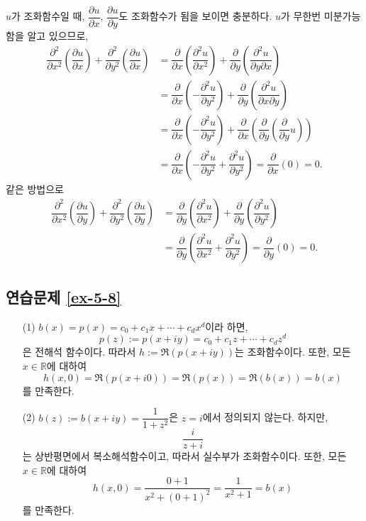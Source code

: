 $u$가 조화함수일 때, $\dfrac{\partial u}{\partial x}$, $\dfrac{\partial u}{\partial y}$도
조화함수가 됨을 보이면 충분하다.
$u$가 무한번 미분가능함을 알고 있으므로,
\begin{align*}
\dfrac{\partial^2}{\partial x^2}\left(\dfrac{\partial u}{\partial x}\right) 
+ \dfrac{\partial^2}{\partial y^2}\left(\dfrac{\partial u}{\partial x}\right) 
&= \dfrac{\partial}{\partial x}\left(\dfrac{\partial^2 u}{\partial x^2}\right) 
+ \dfrac{\partial}{\partial y}\left(\dfrac{\partial^2 u}{\partial y\partial x}\right)  \\
&= \dfrac{\partial}{\partial x}\left(-\dfrac{\partial^2 u}{\partial y^2}\right) 
+ \dfrac{\partial}{\partial y}\left(\dfrac{\partial^2 u}{\partial x\partial y}\right)  \\
&= \dfrac{\partial}{\partial x}\left(-\dfrac{\partial^2 u}{\partial y^2}\right) 
+ \dfrac{\partial}{\partial x}\left(\dfrac{\partial}{\partial y}
\left(\dfrac{\partial}{\partial y}u \right)\right)  \\
&= \dfrac{\partial}{\partial x}\left(-\dfrac{\partial^2 u}{\partial y^2}
+\dfrac{\partial^2 u}{\partial y^2} \right) 
= \dfrac{\partial}{\partial x}(0) = 0.
\end{align*}
같은 방법으로
\begin{align*}
\dfrac{\partial^2}{\partial x^2}\left(\dfrac{\partial u}{\partial y}\right) 
+ \dfrac{\partial^2}{\partial y^2}\left(\dfrac{\partial u}{\partial y}\right)  
&= \dfrac{\partial}{\partial y}\left(\dfrac{\partial^2 u}{\partial x^2}\right) 
+ \dfrac{\partial}{\partial y}\left(\dfrac{\partial^2 u}{\partial y^2}\right)  \\
&= \dfrac{\partial}{\partial y} \left(
\dfrac{\partial^2 u}{\partial x^2} + \dfrac{\partial^2 u}{\partial y^2} \right)
= \dfrac\partial{\partial y}(0) = 0.
\end{align*}

\subsection*{연습문제 \ref{ex-5-8}}

\begin{itemize}
\item[(1)]  $b(x) = p(x) = c_0 + c_1 x + \cdots + c_d x^d$이라 하면,
\[
p(z) := p(x+iy) = c_0 + c_1 z + \cdots + c_d z^d
\]
은 전해석 함수이다. 따라서 $h:= \Re(p(x+iy))$는 조화함수이다.
또한, 모든 $x\in\mathbb R$에 대하여
\[
h(x,0) = \Re(p(x+i0)) =\Re(p(x)) = \Re(b(x)) = b(x)
\]
를 만족한다.

\item[(2)]  $b(z):= b(x+iy) = \dfrac1{1+z^2}$은 $z=i$에서 정의되지 않는다.
하지만,
\[
\dfrac{i}{z+i}
\]
는 상반평면에서 복소해석함수이고, 따라서 실수부가 조화함수이다.
또한, 모든 $x\in\mathbb R$에 대하여
\[
h(x,0) = \dfrac{0+1}{x^2+(0+1)^2} = \dfrac1{x^2+1} = b(x)
\]
를 만족한다.
\end{itemize}

